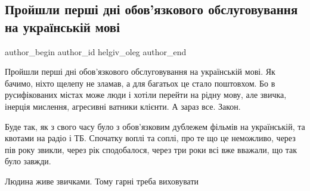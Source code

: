  
 
 
 
 
 
\subsection{Пройшли перші дні обов'язкового обслуговування на українській мові}
\label{sec:19_01_2021.fb.helgiv_oleg.1.mova}
 
\ifcmt
 author_begin
   author_id helgiv_oleg
 author_end
\fi

Пройшли перші дні обов'язкового обслуговування на українській мові. Як бачимо,
ніхто щелепу не зламав, а для багатьох це стало поштовхом. Бо в русифікованих
містах може люди і хотіли перейти на рідну мову, але звичка, інерція мислення,
агресивні ватники клієнти. А зараз все. Закон.

Буде так, як з свого часу було з обов'язковим дублежем фільмів на українській,
та квотами на радіо і ТБ. Спочатку воплі та соплі, про те що це неможливо,
через пів року звикли, через рік сподобалося, через три роки всі вже вважали,
що так було завжди.

Людина живе звичками. Тому гарні треба виховувати

